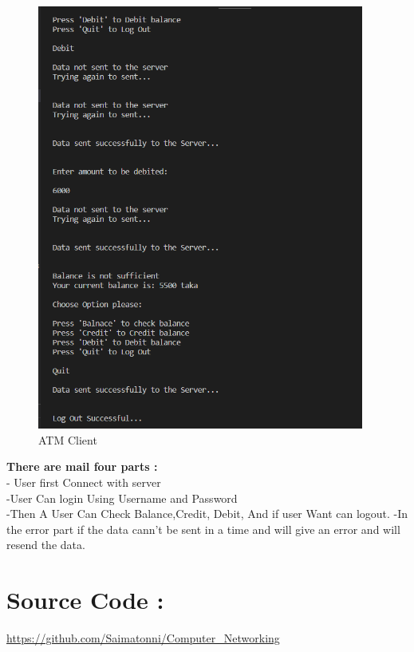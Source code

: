 \documentclass[11pt]{article}
\begin{document}
\begin{figure}[!h]
\centering
\includegraphics[width=\textwidth,height=14cm,keepaspectratio]{atm_client3.png}
\caption{ATM Client}
\end{figure}
\FloatBarrier


\textbf{There are mail four parts :} \\[12pt]
- User first Connect with server\\[2pt]
-User Can login Using Username and Password\\[2pt]
-Then A User Can Check Balance,Credit, Debit, And if user Want can logout.
-In the error part if the data cann't be sent in a time and will give an error and will resend the data.
\section{Source Code :}
\url{https://github.com/Saimatonni/Computer_Networking}
\end{document}
